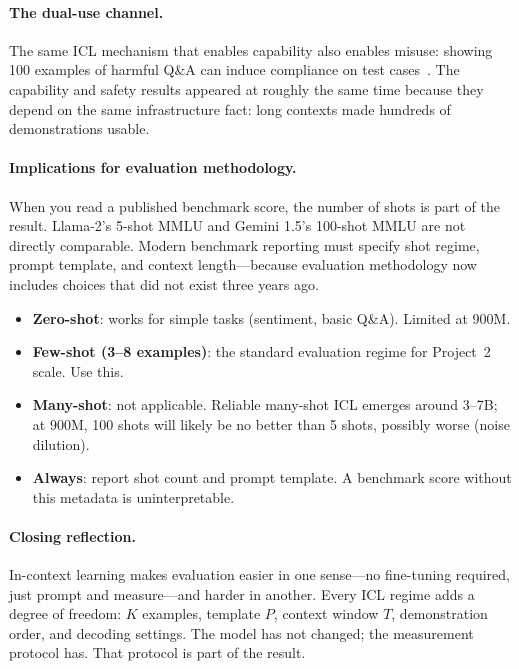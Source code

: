 \paragraph{The dual-use channel.} The same ICL mechanism that enables capability also enables misuse: showing 100 examples of harmful Q\&A can induce compliance on test cases~\cite{anil2024manyshot}. The capability and safety results appeared at roughly the same time because they depend on the same infrastructure fact: long contexts made hundreds of demonstrations usable.

\paragraph{Implications for evaluation methodology.} When you read a published benchmark score, the number of shots is part of the result. Llama-2's 5-shot MMLU and Gemini 1.5's 100-shot MMLU are not directly comparable. Modern benchmark reporting must specify shot regime, prompt template, and context length---because evaluation methodology now includes choices that did not exist three years ago.

\begin{tcolorbox}[colback=orange!5, colframe=orange!60, title=\textbf{For Project~2: ICL at 900M Scale}]
\begin{itemize}[nosep]
  \item \textbf{Zero-shot}: works for simple tasks (sentiment, basic Q\&A). Limited at 900M.
  \item \textbf{Few-shot (3--8 examples)}: the standard evaluation regime for Project~2 scale. Use this.
  \item \textbf{Many-shot}: not applicable. Reliable many-shot ICL emerges around 3--7B; at 900M, 100 shots will likely be no better than 5 shots, possibly worse (noise dilution).
  \item \textbf{Always}: report shot count and prompt template. A benchmark score without this metadata is uninterpretable.
\end{itemize}
\end{tcolorbox}

\paragraph{Closing reflection.} In-context learning makes evaluation easier in one sense---no fine-tuning required, just prompt and measure---and harder in another. Every ICL regime adds a degree of freedom: $K$ examples, template $P$, context window $T$, demonstration order, and decoding settings. The model has not changed; the measurement protocol has. That protocol is part of the result.


